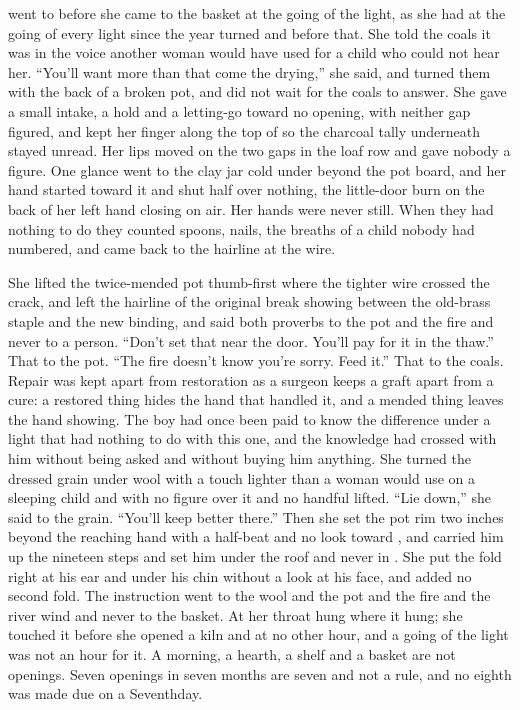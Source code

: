  went to  before she came to the basket at the going of the light, as she had at the going of every light since the year turned and before that. She told the coals it was  in the voice another woman would have used for a child who could not hear her. “You'll want more than that come the drying,” she said, and turned them with the back of a broken pot, and did not wait for the coals to answer. She gave a small intake, a hold and a letting-go toward no opening, with neither gap figured, and kept her finger along the top of  so the charcoal tally underneath stayed unread. Her lips moved on the two gaps in the loaf row and gave nobody a figure. One glance went to the clay jar cold under  beyond the pot board, and her hand started toward it and shut half over nothing, the little-door burn on the back of her left hand closing on air. Her hands were never still. When they had nothing to do they counted spoons, nails, the breaths of a child nobody had numbered, and came back to the hairline at the wire.

She lifted the twice-mended pot thumb-first where the tighter wire crossed the crack, and left the hairline of the original break showing between the old-brass staple and the new binding, and said both proverbs to the pot and the fire and never to a person. “Don't set that near the door. You'll pay for it in the thaw.” That to the pot. “The fire doesn't know you're sorry. Feed it.” That to the coals. Repair was kept apart from restoration as a surgeon keeps a graft apart from a cure: a restored thing hides the hand that handled it, and a mended thing leaves the hand showing. The boy had once been paid to know the difference under a light that had nothing to do with this one, and the knowledge had crossed with him without being asked and without buying him anything. She turned the dressed grain under wool with a touch lighter than a woman would use on a sleeping child and with no figure over it and no handful lifted. “Lie down,” she said to the grain. “You'll keep better there.” Then she set the pot rim two inches beyond the reaching hand with a half-beat and no look toward , and carried him up the nineteen steps and set him under the roof and never in . She put the fold right at his ear and under his chin without a look at his face, and added no second fold. The instruction went to the wool and the pot and the fire and the river wind and never to the basket. At her throat  hung where it hung; she touched it before she opened a kiln and at no other hour, and a going of the light was not an hour for it. A morning, a hearth, a shelf and a basket are not openings. Seven openings in seven months are seven and not a rule, and no eighth was made due on a Seventhday.

